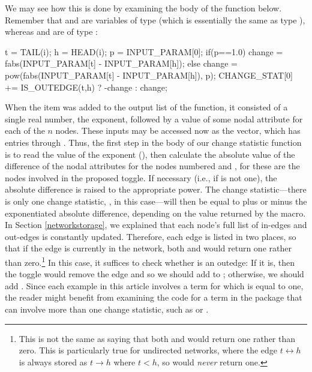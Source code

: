 \documentclass[nojss]{jss}
\begin{document}
We may see how this is done by examining the body of the  function below.
Remember that  and  are variables of type  (which is essentially
the same as type ), whereas  and  are of type
:
\begin{CodeChunk}
\begin{CodeInput}
    t = TAIL(i); h = HEAD(i);
    p = INPUT_PARAM[0];
    if(p==1.0){
      change = fabs(INPUT_PARAM[t] - INPUT_PARAM[h]);
    }else{
      change = pow(fabs(INPUT_PARAM[t] - INPUT_PARAM[h]), p);
    }
    CHANGE_STAT[0] += IS_OUTEDGE(t,h) ? -change : change;
\end{CodeInput}
\end{CodeChunk}
When the  item was added to the output list of the
 function, it consisted of a single
real number, the exponent, followed by a value of some nodal attribute
for each of the $n$ nodes.  These inputs may be accessed now as the
 vector, which has entries
 through .
Thus, the first step in the body of our change statistic function is to read the value of
the exponent (), then calculate the absolute value of the
difference of the nodal attributes for the nodes numbered  and ,
for these are the nodes involved in the proposed toggle.  If necessary (i.e.,
if  is not one),
the absolute difference is raised to the appropriate power.
The change statistic---there is only one change statistic,
, in this case---will then be equal to plus or minus
the exponentiated absolute difference, depending on the value
returned by the  macro.  In Section \ref{networkstorage},
we explained that each node's full list of in-edges and out-edges is constantly
updated.  Therefore, each edge is listed in two places, so that if the
edge  is currently in the network, both
 and  would return one
rather than zero.\footnote{This is not the same as saying that
both  and  would return one rather than zero.  This is particularly true for undirected networks, where the edge
$t\!\longleftrightarrow\!h$ is always stored as
$t\!\longrightarrow\!h$ where $t<h$, so
 would {\em never} return one.}
In this case, it suffices to check whether  is
an outedge:  If it is, then the toggle would remove the edge and so
we should add  to ; otherwise,
we should add .  Since each example in this
article involves a term for which 
 is equal to one, the reader might 
benefit from examining the 
code for a term in the  package that can involve
more than one change statistic, such as 
 or .
\end{document}
